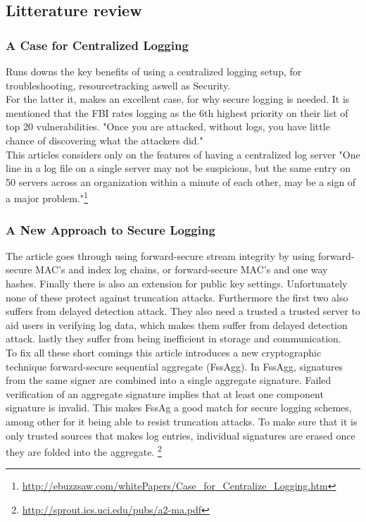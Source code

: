 
\subsection{Litterature review}

\subsubsection{A Case for Centralized Logging }

Runs downs the key benefits of using a centralized logging setup, for troubleshooting, resourcetracking aswell as Security. \\
For the latter it, makes an excellent case, for why secure logging is needed. It is mentioned that the FBI rates logging as the 6th highest priority on their list of top 20 vulnerabilities. "Once you are attacked, without logs, you have little chance of discovering what the attackers did."\\
This articles considers only on the features of having a centralized log server "One line in a log file on a single server may not be suspicious, but the same entry on 50 servers across an organization within a minute of each other, may be a sign of a major problem."\footnote{\url{http://ebuzzsaw.com/whitePapers/Case_for_Centralize_Logging.htm}}

\subsubsection{A New Approach to Secure Logging}
The article goes through using forward-secure stream integrity by using forward-secure MAC's and index log chains, or forward-secure MAC's and one way hashes. Finally there is also an extension for public key settings. Unfortunately none of these protect against truncation attacks. Furthermore the first two also suffers from delayed detection attack. They also need a trusted a trusted server to aid users in verifying log data, which makes them suffer from delayed detection attack. lastly they suffer from being inefficient in storage and communication.\\
To fix all these short comings this article introduces a new cryptographic technique  forward-secure sequential aggregate (FssAgg). In FssAgg, signatures from the same signer are combined into a single aggregate signature. Failed verification of an aggregate signature implies that at least one component signature is invalid. This makes FssAg a good match for secure logging schemes, among other for it being able to resist truncation attacks. To make sure that it is only trusted sources that makes log entries, individual signatures are erased once they are folded into the aggregate.
\footnote{\url{http://sprout.ics.uci.edu/pubs/a2-ma.pdf}}
